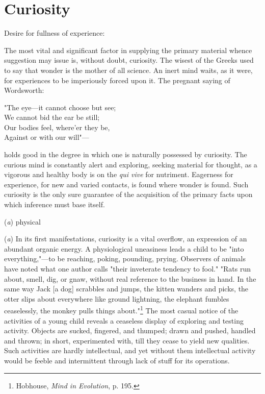 \documentclass[letterpaper]{book}
\begin{document}
\section{Curiosity}

Desire for fullness of experience:

The most vital and significant factor in supplying the primary material
whence suggestion may issue is, without doubt, curiosity. The wisest of
the Greeks used
to
say that wonder is the mother of all science. An inert mind waits, as it
were, for experiences to be imperiously forced upon it. The pregnant
saying of Wordsworth:

{"The eye---it cannot choose but see;\\
} {We cannot bid the ear be still;\\
} {Our bodies feel, where'er they be,\\
} {Against or with our will"---\\
}

holds good in the degree in which one is naturally possessed by
curiosity. The curious mind is constantly alert and exploring, seeking
material for thought, as a vigorous and healthy body is on the \emph{qui
vive} for nutriment. Eagerness for experience, for new and varied
contacts, is found where wonder is found. Such curiosity is the only
sure guarantee of the acquisition of the primary facts upon which
inference must base itself.

(\emph{a}) physical

(\emph{a}) In its first manifestations, curiosity is a vital overflow,
an expression of an abundant organic energy. A physiological uneasiness
leads a child to be "into everything,"---to be reaching, poking,
pounding, prying. Observers of animals have noted what one author calls
"their inveterate tendency to fool." "Rats run about, smell, dig, or
gnaw, without real reference to the business in hand. In the same way
Jack {[}a dog{]} scrabbles and jumps, the kitten wanders and picks, the
otter slips about everywhere like ground lightning, the elephant fumbles
ceaselessly, the monkey pulls things
about."\footnote{Hobhouse, \emph{Mind in Evolution}, p. 195. }
The most casual notice of the activities of a young child reveals a
ceaseless display of exploring and testing activity. Objects are sucked,
fingered, and thumped; drawn and pushed, handled and thrown; in short,
experimented
with, till they cease to yield new qualities. Such activities are hardly
intellectual, and yet without them intellectual activity would be feeble
and intermittent through lack of stuff for its operations.
\end{document}
